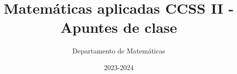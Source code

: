 \documentclass[nobuilddate]{Docencia}
\title{Matemáticas aplicadas CCSS II - Apuntes de clase}
\author{Departamento de Matemáticas}
\date{2023-2024}
\begin{document}
\pagestyle{plain}
\maketitle
\tableofcontents
\newpage

\newcommand{\hide}[1]{#1}

\renewcommand{\vec}[1]{\overrightarrow{#1}}

%
%    
%    
%    
%
%
%
%
%
%
%
%

%
%
%
%
%


\newpage
\printindex
\listoffigures
\listoftables
\end{document}
